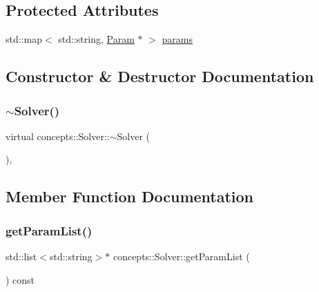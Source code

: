 \subsection*{Protected Attributes}
\begin{DoxyCompactItemize}
\item 
std\+::map$<$ std\+::string, \hyperlink{classconcepts_1_1_solver_1_1_param}{Param} $\ast$ $>$ \hyperlink{classconcepts_1_1_solver_a6b85828f79e693cba963f2fc98f7edd2}{params}
\end{DoxyCompactItemize}


\subsection{Constructor \& Destructor Documentation}
\mbox{\label{classconcepts_1_1_solver_a550134cf412d2c1c1b8c6eed1a477090}} 
\subsubsection{\texorpdfstring{$\sim$\+Solver()}{~Solver()}}
{\footnotesize\ttfamily virtual concepts\+::\+Solver\+::$\sim$\+Solver (\begin{DoxyParamCaption}{ }\end{DoxyParamCaption})\hspace{0.3cm}{\ttfamily [inline]}, {\ttfamily [virtual]}}



\subsection{Member Function Documentation}
\mbox{\label{classconcepts_1_1_solver_a65cee6a06fd6c1439f3c17fb7e7fb42c}} 
\subsubsection{\texorpdfstring{get\+Param\+List()}{getParamList()}}
{\footnotesize\ttfamily std\+::list$<$std\+::string$>$$\ast$ concepts\+::\+Solver\+::get\+Param\+List (\begin{DoxyParamCaption}{ }\end{DoxyParamCaption}) const\hspace{0.3cm}{\ttfamily [inline]}}

